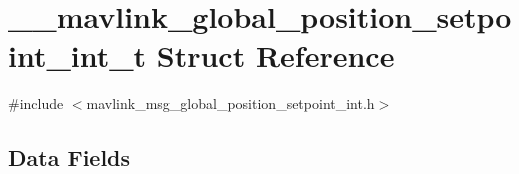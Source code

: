 \hypertarget{struct____mavlink__global__position__setpoint__int__t}{\section{\-\_\-\-\_\-mavlink\-\_\-global\-\_\-position\-\_\-setpoint\-\_\-int\-\_\-t Struct Reference}
\label{struct____mavlink__global__position__setpoint__int__t}
}


{\ttfamily \#include $<$mavlink\-\_\-msg\-\_\-global\-\_\-position\-\_\-setpoint\-\_\-int.\-h$>$}

\subsection*{Data Fields}
